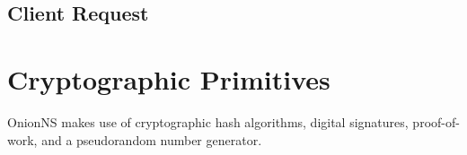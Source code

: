 \subsection{Client Request}








\section{Cryptographic Primitives}

OnionNS makes use of cryptographic hash algorithms, digital signatures, proof-of-work, and a pseudorandom number generator.

